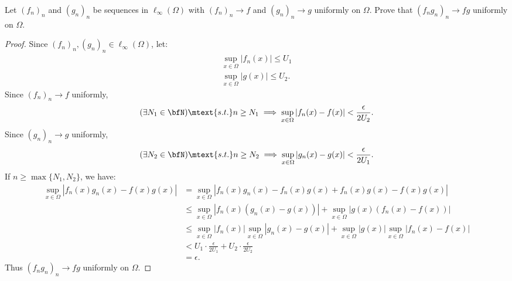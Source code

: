 \documentclass[10pt,twoside,openany]{memoir}
\begin{document}
    \begin{exercise}
        Let $(f_n)_n$ and $(g_n)_n$ be sequences in $\ell_\infty(\Omega)$ with $(f_n)_n \rightarrow f$ and $(g_n)_n \rightarrow g$ uniformly on $\Omega$. Prove that $(f_n g_n)_n \rightarrow fg$ uniformly on $\Omega$.
    \end{exercise}
        \begin{proof}
            Since $(f_n)_n,(g_n)_n \in \ell_\infty(\Omega)$, let:
                \begin{equation*}
                \begin{split}
                    \sup_{x \in \Omega}|f_n(x)| \leq U_1 \\
                    \sup_{x \in \Omega}|g(x)| \leq U_2.
                \end{split}
                \end{equation*}
            Since $(f_n)_n \rightarrow f$ uniformly,
                \begin{equation*}
                \begin{split}
                    (\exists N_1 \in \bfN)\mtext{s.t.}n \geq N_1 \implies \sup_{x \in \Omega}|f_n(x) - f(x)| < \frac{\epsilon}{2U_2}.
                \end{split}
                \end{equation*}
            Since $(g_n)_n \rightarrow g$ uniformly,
                \begin{equation*}
                \begin{split}
                    (\exists N_2 \in \bfN)\mtext{s.t.}n \geq N_2 \implies \sup_{x \in \Omega}|g_n(x) - g(x)| < \frac{\epsilon}{2U_1}.
                \end{split}
                \end{equation*}
            If $n \geq \max\{N_1,N_2\}$, we have:
                \begin{equation*}
                \begin{split}
                    \sup_{x \in \Omega}|f_n(x)g_n(x) - f(x)g(x)|
                    & = \sup_{x \in \Omega}|f_n(x)g_n(x) - f_n(x)g(x) + f_n(x)g(x) - f(x)g(x)| \\
                    & \leq \sup_{x \in \Omega}|f_n(x)(g_n(x) - g(x))| + \sup_{x \in \Omega}|g(x)(f_n(x) - f(x))| \\
                    & \leq \sup_{x \in \Omega}|f_n(x)|\sup_{x \in \Omega}|g_n(x) - g(x)| + \sup_{x \in \Omega}|g(x)|\sup_{x \in \Omega}|f_n(x) - f(x)| \\
                    &< U_1 \cdot \frac{\epsilon}{2U_1} + U_2 \cdot \frac{\epsilon}{2U_2} \\
                    & = \epsilon.
                \end{split}
                \end{equation*}
            Thus $(f_n g_n)_n \rightarrow fg$ uniformly on $\Omega$.
        \end{proof}
\end{document}
